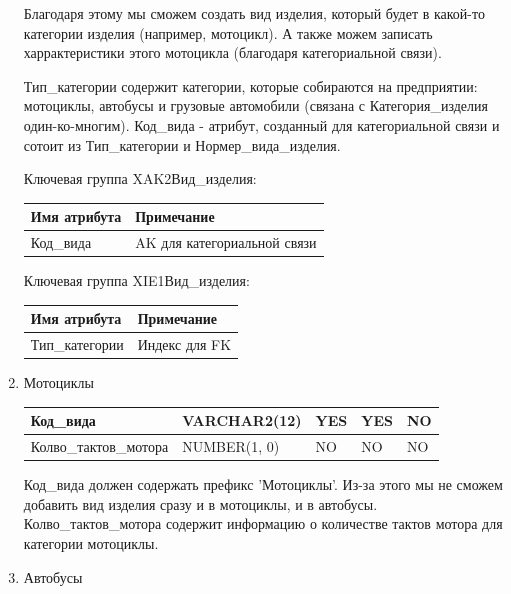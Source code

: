 \begin{enumerate}
    Благодаря этому мы сможем создать вид изделия, который будет в какой-то категории изделия (например, мотоцикл).
    А также можем записать харрактеристики этого мотоцикла (благодаря категориальной связи).

    Тип\_категории содержит категории, которые собираются на предприятии: мотоциклы, автобусы и грузовые автомобили (связана с Категория\_изделия один-ко-многим).
    Код\_вида - атрибут, созданный для категориальной связи и сотоит из Тип\_категории и Нормер\_вида\_изделия.

    Ключевая группа XAK2Вид\_изделия:

    \begin{tabular}{|p{7cm}|p{9.3cm}|} \hline

        {\bf Имя атрибута} & {\bf Примечание} \\ \hline
        Код\_вида & AK для категориальной связи \\ \hline

    \end{tabular}

    Ключевая группа XIE1Вид\_изделия:

    \begin{tabular}{|p{7cm}|p{9.3cm}|} \hline

        {\bf Имя атрибута} & {\bf Примечание} \\ \hline
        Тип\_категории & Индекс для FK \\ \hline

    \end{tabular}

    \item{Мотоциклы}

    \begin{tabular}{|p{7cm}|p{3cm}|p{1cm}|p{1cm}|p{3cm}|} \hline
        Код\_вида & VARCHAR2(12) & YES & YES & NO \\ \hline
        Колво\_тактов\_мотора & NUMBER(1, 0) & NO & NO & NO \\ \hline

    \end{tabular}

    Код\_вида должен содержать префикс 'Мотоциклы'.
    Из-за этого мы не сможем добавить вид изделия сразу и в мотоциклы, и в автобусы.
    Колво\_тактов\_мотора содержит информацию о количестве тактов мотора для категории мотоциклы.

    \item{Автобусы}

    \begin{tabular}{|p{7cm}|p{3cm}|p{1cm}|p{1cm}|p{3cm}|} \hline


\end{tabular}
\end{enumerate}
